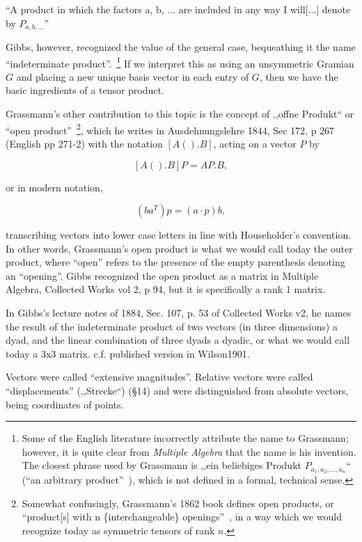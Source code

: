 ``A product in which the factors a, b, ... are included in any way I will[...] denote by $P_{a,b,...}$''~\cite[p. 22, \S 43]{Grassmann2000}

Gibbs, however, recognized the value of the general case, bequeathing it the name ``indeterminate product''.~\footnote{Some of the English literature incorrectly attribute the name to Grassmann; however, it is quite clear from \textit{Multiple Algebra} that the name is his invention. The closest phrase used by Grassmann is ,,ein beliebiges Produkt $P_{a_1, a_2, ..., a_n}$`` (``an arbitrary product''~\cite[p. 196, \S 353]{Grassmann2000}), which is not defined in a formal, technical sense.} If we interpret this as using an unsymmetric Gramian $G$ and placing a new unique basis vector in each entry of $G$, then we have the basic ingredients of a tensor product.

Grassmann's other contribution to this topic is the concept of ,,offne Produkt`` or ``open product''~\footnote{Somewhat confusingly, Grassmann's 1862 book defines open products, or ``product[s] with n \{interchangeable\} openings''~\cite[\S\S 353, p. 196]{Grassmann2000}, in a way which we would recognize today as symmetric tensors of rank $n$.}, which he writes in Ausdehnungslehre 1844, Sec 172, p 267 (English pp 271-2) with the notation $[A() . B]$, acting on a vector $P$ by

\[
[A() . B] P = AP . B,
\]

or in modern notation,

\[
(b a^T) p = (a\cdot p) b,
\]

transcribing vectors into lower case letters in line with Householder's convention. In other words, Grassmann's open product is what we would call today the outer product, where ``open'' refers to the presence of the empty parenthesis denoting an ``opening''. Gibbs recognized the open product as a matrix in Multiple Algebra, Collected Works vol 2, p 94, but it is specifically a rank 1 matrix. 

In Gibbs's lecture notes of 1884, Sec. 107, p. 53 of Collected Works v2, he names the result of the indeterminate product of two vectors (in three dimensions) a dyad, and the linear combination of three dyads a dyadic, or what we would call today a 3x3 matrix. c.f. published version in Wilson1901.

Vectors were called ``extensive magnitudes''. Relative vectors were called ``displacements'' (,,Strecke``) (\S 14) and were distinguished from absolute vectors, being coordinates of points.

